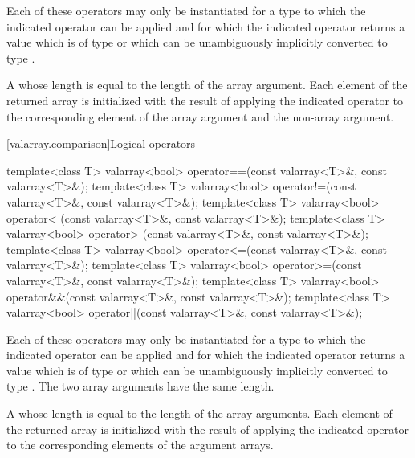 \begin{itemdescr}
\pnum
\requires
Each of these operators may only be instantiated for a type 
to which the indicated operator can be applied and for which
the indicated operator returns a value which is of type 
or which can be unambiguously implicitly converted to type .

\pnum
\returns
A  whose length is equal to the
length of the array argument.
Each element of the returned array is
initialized with the result of applying the indicated operator to the
corresponding element of the array argument and the non-array argument.
\end{itemdescr}

[valarray.comparison]{Logical operators}

%
%
%
%
%
%
%
%
\begin{itemdecl}
template<class T> valarray<bool> operator==(const valarray<T>&, const valarray<T>&);
template<class T> valarray<bool> operator!=(const valarray<T>&, const valarray<T>&);
template<class T> valarray<bool> operator< (const valarray<T>&, const valarray<T>&);
template<class T> valarray<bool> operator> (const valarray<T>&, const valarray<T>&);
template<class T> valarray<bool> operator<=(const valarray<T>&, const valarray<T>&);
template<class T> valarray<bool> operator>=(const valarray<T>&, const valarray<T>&);
template<class T> valarray<bool> operator&&(const valarray<T>&, const valarray<T>&);
template<class T> valarray<bool> operator||(const valarray<T>&, const valarray<T>&);
\end{itemdecl}

\begin{itemdescr}
\pnum
\requires
Each of these operators may only be instantiated for a type 
to which the indicated operator can be applied and for which
the indicated operator returns a value which is of type 
or which can be unambiguously implicitly converted to type .
The two array arguments have the same length.

\pnum
\returns
A  whose length
is equal to the length of the array arguments.
Each element of the returned
array is initialized with the result of applying the indicated
operator to the corresponding elements of the argument arrays.
\end{itemdescr}

